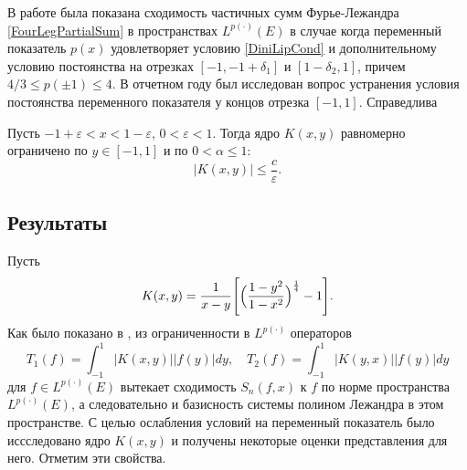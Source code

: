В работе \cite{tad-SHII-Leg} была показана сходимость частичных сумм Фурье-Лежандра  \eqref{FourLegPartialSum} в пространствах $L^{p(\cdot)}(E)$ в случае когда переменный показатель $p(x)$ удовлетворяет условию \eqref{DiniLipCond} и дополнительному условию постоянства на отрезках $[-1,-1+\delta_1]$ и $[1-\delta_2,1]$, причем $4/3\le p(\pm1)\le4$. В отчетном году был исследован вопрос устранения условия постоянства переменного показателя у концов отрезка $[-1,1]$.
Справедлива
\begin{lemma}\label{st-Kxy-bounded}
Пусть $-1+\varepsilon < x < 1 - \varepsilon$, $0 < \varepsilon < 1$. Тогда ядро $K(x,y)$ равномерно ограничено по $y \in [-1,1]$ и по $0 < \alpha \le 1$:
\begin{equation*}
|K(x,y)| \le \frac{c}{\varepsilon}.
\end{equation*}
\end{lemma}


\subsection{Результаты}

Пусть
\begin{equation}
K(x,y)=\frac{1}{x-y}\Biggl[ \Bigl(\frac{1-y^2}{1-x^2} \Bigr)^\frac14 - 1 \Biggr].
\end{equation}
Как было показано в \cite{tad-SHII-Leg}, из ограниченности в $L^{p(\cdot)}$ операторов
\begin{equation}\label{T1T2-def}
T_1(f)=\int_{-1}^1 |K(x,y)||f(y)|dy, \quad
T_2(f)=\int_{-1}^1 |K(y,x)||f(y)|dy
\end{equation}
для $f\in L^{p(\cdot)}(E)$ вытекает сходимость $S_n(f,x)$ к $f$ по норме пространства $L^{p(\cdot)}(E)$, а следовательно и базисность системы полином Лежандра в этом пространстве. С целью ослабления условий на переменный показатель было иссследовано ядро $K(x,y)$ и получены некоторые оценки представления для него. Отметим эти свойства.

